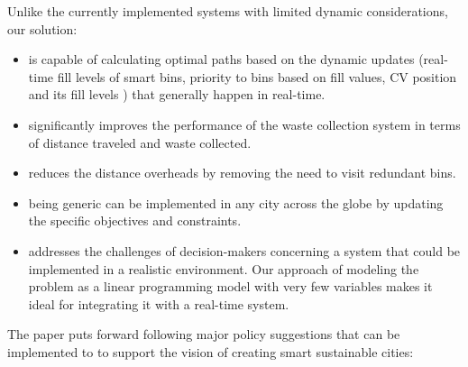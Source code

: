 \documentclass[12pt]{article}
\begin{document}
Unlike the currently implemented systems with limited dynamic considerations, our solution:
\begin{itemize}
   
    \item is capable of calculating optimal paths based on the dynamic updates (real-time fill levels of smart bins, priority to bins based on fill values, CV position and its fill levels ) that generally happen in real-time.
    \item significantly improves the performance of the waste collection system in terms of distance traveled and waste collected.
    \item reduces the distance overheads by removing the need to visit redundant bins.
    \item being generic can be implemented in any city across the globe by updating the specific objectives and constraints. 
    
    \item addresses the challenges of decision-makers concerning a system that could be implemented in a realistic environment. Our approach of modeling the problem as a linear programming model with very few variables makes it ideal for integrating it with a real-time system.


\end{itemize}

The paper puts forward following major policy suggestions that can be implemented to to support the vision of creating smart sustainable cities:
\end{document}
